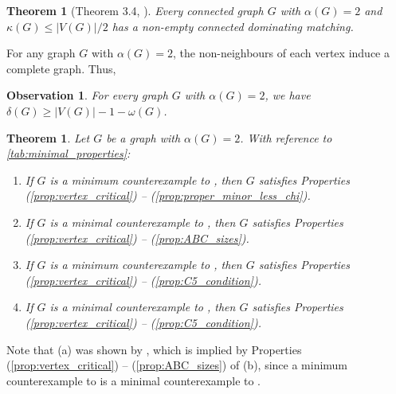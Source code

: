 \documentclass[11pt]{article}
\numberwithin{equation}{section}
\theoremstyle{plain}
\newtheorem{thm}[equation]{Theorem}
\newtheorem{obs}[equation]{Observation}
\theoremstyle{definition}
\renewcommand{\geq}{\geqslant}
\renewcommand{\leq}{\leqslant}
\newcommand{\propref}[1]{\textup{(\ref{#1})}}
\begin{document}
\begin{thm}[Theorem 3.4, \citep{PST03}]
    \label{thm:connectivity}
    Every connected graph $G$ with $\alpha(G) = 2$ and $\kappa(G) \leq |V(G)| / 2$ has a non-empty connected dominating matching.
\end{thm}
For any graph $G$ with $\alpha(G) = 2$, the non-neighbours of each vertex induce a complete graph. Thus,
\begin{obs}
    \label{obs:non-neighbours}
    For every graph $G$ with $\alpha(G) = 2$, we have $\delta(G) \geq |V(G)| - 1 - \omega(G)$.
\end{obs}

\begin{thm}
    \label{thm:minimal_properties}
    Let $G$ be a graph with $\alpha(G) = 2$. With reference to \cref{tab:minimal_properties}:
    \begin{enumerate}[label=(\alph*),leftmargin=2em]
        \item If $G$ is a minimum counterexample to , then $G$ satisfies Properties \propref{prop:vertex_critical} -- \propref{prop:proper_minor_less_chi}.

        \item If $G$ is a minimal counterexample to , then $G$ satisfies Properties \propref{prop:vertex_critical} -- \propref{prop:ABC_sizes}.

        \item If $G$ is a minimum counterexample to , then $G$ satisfies Properties \propref{prop:vertex_critical} -- \propref{prop:C5_condition}.

        \item If $G$ is a minimal counterexample to , then $G$ satisfies Properties \propref{prop:vertex_critical} -- \propref{prop:C5_condition}.
    \end{enumerate}
\end{thm}
Note that (a) was shown by \citet{PST03}, which is implied by Properties \propref{prop:vertex_critical} -- \propref{prop:ABC_sizes} of (b), since a minimum counterexample to  is a minimal counterexample to .
\end{document}
